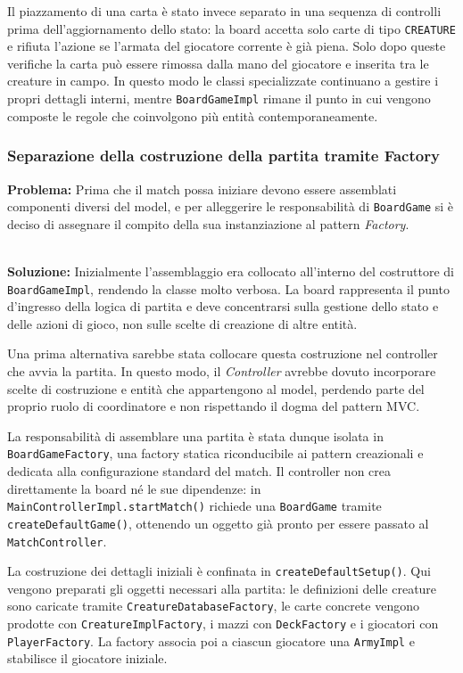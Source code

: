 Il piazzamento di una carta è stato invece separato in una sequenza di controlli
prima dell'aggiornamento dello stato: la board accetta solo carte di tipo
\texttt{CREATURE} e rifiuta l'azione se l'armata del giocatore corrente è già
piena. Solo dopo queste verifiche la carta può essere rimossa dalla mano del
giocatore e inserita tra le creature in campo. In questo modo le classi
specializzate continuano a gestire i propri dettagli interni, mentre
\texttt{BoardGameImpl} rimane il punto in cui vengono composte le regole che
coinvolgono più entità contemporaneamente.

\subsubsection{Separazione della costruzione della partita tramite Factory}

\textbf{Problema:} Prima che il match possa iniziare devono
essere assemblati componenti diversi del model, e per alleggerire le
responsabilità di \texttt{BoardGame} si è deciso di assegnare il compito della sua
instanziazione al pattern \textit{Factory}.

\textbf{\\Soluzione:} Inizialmente l'assemblaggio era collocato all'interno del costruttore di
\texttt{BoardGameImpl}, rendendo la classe molto verbosa. La board rappresenta
il punto d'ingresso della logica di partita e deve concentrarsi sulla gestione dello stato
e delle azioni di gioco, non sulle scelte di creazione di altre entità.

Una prima alternativa sarebbe stata collocare questa costruzione nel controller
che avvia la partita. In questo modo, il \textit{Controller} avrebbe dovuto incorporare
scelte di costruzione e entità che appartengono al model, perdendo parte del proprio
ruolo di coordinatore e non rispettando il dogma del pattern MVC\@.

La responsabilità di assemblare una partita è stata dunque
isolata in \texttt{BoardGameFactory}, una factory statica riconducibile ai
pattern creazionali e dedicata alla configurazione standard del match. Il
controller non crea direttamente la board né le sue dipendenze: in
\texttt{MainControllerImpl.startMatch()} richiede una \texttt{BoardGame} tramite
\texttt{createDefaultGame()}, ottenendo un oggetto già pronto per essere passato
al \texttt{MatchController}.

La costruzione dei dettagli iniziali è confinata in
\texttt{createDefaultSetup()}. Qui vengono preparati gli oggetti necessari alla
partita: le definizioni delle creature sono caricate tramite
\texttt{CreatureDatabaseFactory}, le carte concrete vengono prodotte con
\texttt{CreatureImplFactory}, i mazzi con \texttt{DeckFactory} e i giocatori
con \texttt{PlayerFactory}. La factory associa poi a ciascun giocatore una
\texttt{ArmyImpl} e stabilisce il giocatore iniziale.

